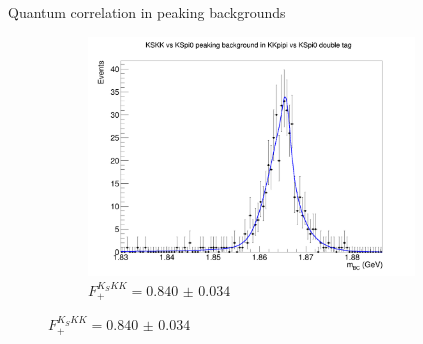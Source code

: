 \documentclass{beamer}
\begin{document}
\begin{frame}{Quantum correlation in peaking backgrounds}
\begin{figure}
\begin{subfigure}{0.5\textwidth}
      \includegraphics[width=0.95\textwidth]{Plots/KSKK_to_KKpipi_vs_KSpi0_DoubleTag_FitPlot.png}
      \caption{$F_+^{K_SKK} = \SI{0.840(34)}{}$}
    \end{subfigure}
  \end{figure}
\end{frame}
\end{document}
